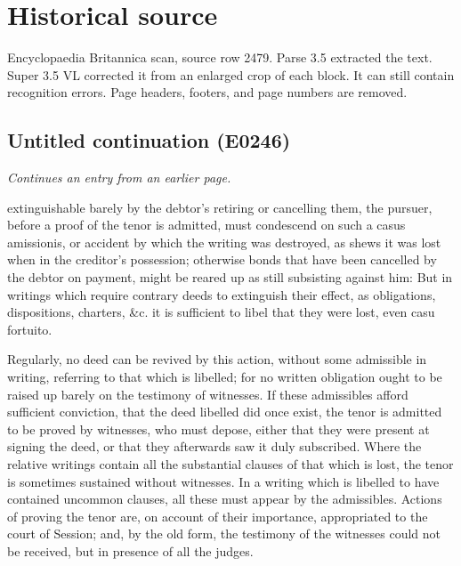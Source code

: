 \documentclass{article}
\begin{document}
\section*{Historical source}
Encyclopaedia Britannica scan, source row 2479. Parse 3.5 extracted the text. Super 3.5 VL corrected it from an enlarged crop of each block. It can still contain recognition errors.
Page headers, footers, and page numbers are removed.

\subsection*{Untitled continuation (E0246)}
\textit{Continues an entry from an earlier page.}

extinguishable barely by the debtor's retiring or cancelling them, the pursuer, before a proof of the tenor is admitted, must condescend on such a casus amissionis, or accident by which the writing was destroyed, as shews it was lost when in the creditor's possession; otherwise bonds that have been cancelled by the debtor on payment, might be reared up as still subsisting against him: But in writings which require contrary deeds to extinguish their effect, as obligations, dispositions, charters, \&c. it is sufficient to libel that they were lost, even casu fortuito.

Regularly, no deed can be revived by this action, without some admissible in writing, referring to that which is libelled; for no written obligation ought to be raised up barely on the testimony of witnesses. If these admissibles afford sufficient conviction, that the deed libelled did once exist, the tenor is admitted to be proved by witnesses, who must depose, either that they were present at signing the deed, or that they afterwards saw it duly subscribed. Where the relative writings contain all the substantial clauses of that which is lost, the tenor is sometimes sustained without witnesses. In a writing which is libelled to have contained uncommon clauses, all these must appear by the admissibles. Actions of proving the tenor are, on account of their importance, appropriated to the court of Session; and, by the old form, the testimony of the witnesses could not be received, but in presence of all the judges.
\end{document}
